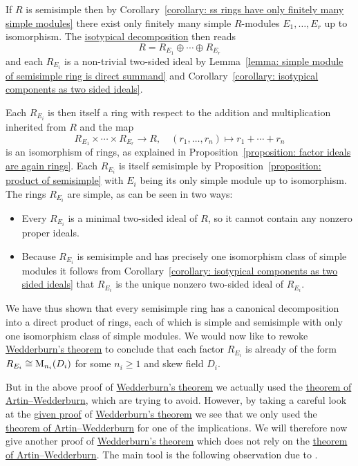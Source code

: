 \begin{fluff}
  \label{fluff: intro to artin wedderburn}
  If $R$ is semisimple then by Corollary~\ref{corollary: ss rings have only finitely many simple modules} there exist only finitely many simple $R$-modules $E_1, \dotsc, E_r$ up to isomorphism.
  The \hyperref[theorem: isotypical decomposition]{isotypical decomposition} then reads
  \[
      R
    = R_{E_1} \oplus \dotsb \oplus R_{E_r}
  \]
  and each $R_{E_i}$ is a non-trivial two-sided ideal by Lemma~\ref{lemma: simple module of semisimple ring is direct summand} and Corollary~\ref{corollary: isotypical components as two sided ideals}.
  
  Each $R_{E_i}$ is then itself a ring with respect to the addition and multiplication inherited from $R$ and the map
  \[
            R_{E_1} \times \dotsb \times R_{E_r}
    \to     R,
    \quad   (r_1, \dotsc, r_n)
    \mapsto r_1 + \dotsb + r_n
  \]
  is an isomorphism of rings, as explained in Proposition~\ref{proposition: factor ideals are again rings}.
  Each $R_{E_i}$ is itself semisimple by Proposition~\ref{proposition: product of semisimple} with $E_i$ being its only simple module up to isomorphism.
  The rings $R_{E_i}$ are simple, as can be seen in two ways:
  \begin{itemize}
    \item
      Every $R_{E_i}$ is a minimal two-sided ideal of $R$, so it cannot contain any nonzero proper ideals.
    \item
      Because $R_{E_i}$ is semisimple and has precisely one isomorphism class of simple modules it follows from Corollary~\ref{corollary: isotypical components as two sided ideals} that $R_{E_i}$ is the unique nonzero two-sided ideal of $R_{E_i}$.
  \end{itemize}
  
  We have thus shown that every semisimple ring has a canonical decomposition into a direct product of rings, each of which is simple and semisimple with only one isomorphism class of simple modules.
  We would now like to rewoke \hyperref[theorem: wedderburns theorem]{Wedderburn’s theorem} to conclude that each factor $R_{E_i}$ is already of the form $R_{E_i} \cong \operatorname{M}_{n_i}(D_i)$ for some $n_i \geq 1$ and skew field $D_i$.
  
  But in the above proof of \hyperref[theorem: wedderburns theorem]{Wedderburn’s theorem} we actually used the \hyperref[theorem: artin wedderburn theorem]{theorem of Artin--Wedderburn}, which are trying to avoid.
  However, by taking a careful look at the \hyperref[proof: wedderburns theorem first proof]{given proof} of \hyperref[theorem: wedderburns theorem]{Wedderburn’s theorem} we see that we only used the \hyperref[theorem: artin wedderburn theorem]{theorem of Artin--Wedderburn} for one of the implications.
  We will therefore now give another proof of \hyperref[theorem: wedderburns theorem]{Wedderburn’s theorem} which does not rely on the \hyperref[theorem: artin wedderburn theorem]{theorem of Artin--Wedderburn}.
  The main tool is the following observation due to \cite{Rieffel}.
\end{fluff}



